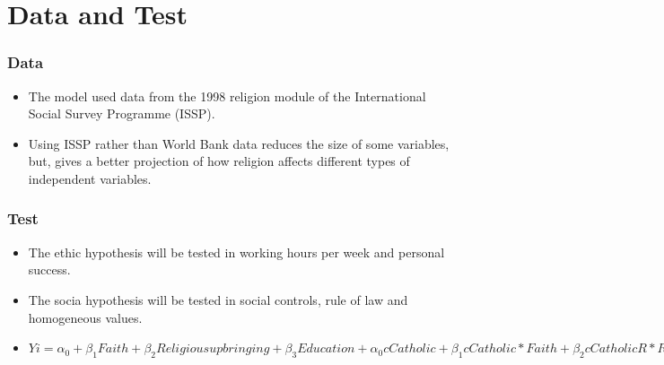 \documentclass[pdftex,12pt,xcolor=pdftex,table]{beamer}
\begin{document}
\section{Data and Test}
\begin{frame}
\frametitle{Data}
\begin{itemize}
\item  The model used data from the 1998 religion module of the International Social Survey Programme (ISSP).
\item Using ISSP rather than World Bank data reduces the size of some variables, but, gives a better projection of how religion affects different types of independent variables. 
 \end{itemize}
\end{frame}
\begin{frame}
\frametitle{Test}
\begin{itemize}
\item The ethic hypothesis will be tested in working hours per week and  personal success.
\item The socia hypothesis will be tested in social controls, rule of law and homogeneous values.
\item $Yi = \alpha_0+\beta_1Faith+\beta_2Religious upbringing+\beta_3Education+\alpha_0c Catholic+\beta_1c Catholic*Faith+\beta_2c CatholicR*ReligiousUpbringing+\beta_3c Catholic*Education+\sum_t(\beta_tControl_mvariables)+\sum_r(\beta_rCountry_ndummies)$
 \end{itemize}
\end{frame}
\end{document}
